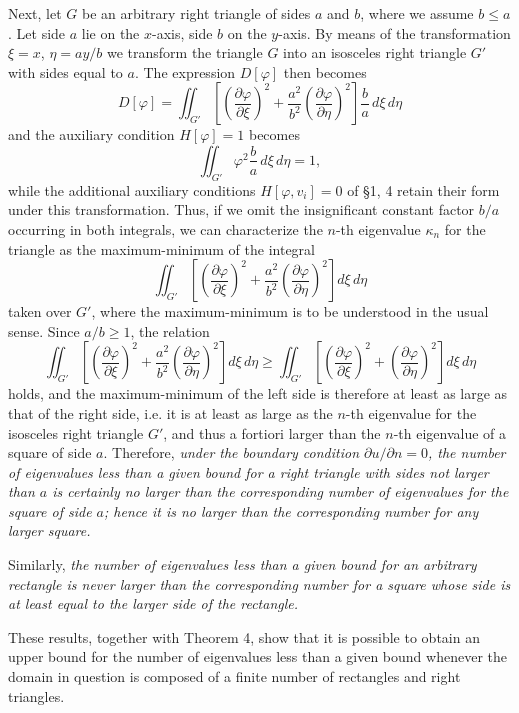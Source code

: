 Next, let $G$ be an arbitrary right triangle of sides $a$ and $b$, where we assume $b\le a$. Let side $a$ lie on the $x$-axis, side $b$ on the $y$-axis. By means of the transformation $\xi=x$, $\eta=ay/b$ we transform the triangle $G$ into an isosceles right triangle $G'$ with sides equal to $a$. The expression $D[\varphi]$ then becomes
\[
D[\varphi]=\iint_{G'}\left[\left(\frac{\partial\varphi}{\partial\xi}\right)^2
+\frac{a^2}{b^2}\left(\frac{\partial\varphi}{\partial\eta}\right)^2\right]\frac ba\,d\xi\,d\eta
\]
and the auxiliary condition $H[\varphi]=1$ becomes
\[
\iint_{G'}\varphi^2\frac ba\,d\xi\,d\eta=1,
\]
while the additional auxiliary conditions $H[\varphi,v_i]=0$ of \S1, 4 retain their form under this transformation. Thus, if we omit the insignificant constant factor $b/a$ occurring in both integrals, we can characterize the $n$-th eigenvalue $\kappa_n$ for the triangle as the maximum-minimum of the integral
\[
\iint_{G'}\left[\left(\frac{\partial\varphi}{\partial\xi}\right)^2
+\frac{a^2}{b^2}\left(\frac{\partial\varphi}{\partial\eta}\right)^2\right]d\xi\,d\eta
\]
taken over $G'$, where the maximum-minimum is to be understood in the usual sense. Since $a/b\ge1$, the relation
\[
\iint_{G'}\left[\left(\frac{\partial\varphi}{\partial\xi}\right)^2
+\frac{a^2}{b^2}\left(\frac{\partial\varphi}{\partial\eta}\right)^2\right]d\xi\,d\eta
\ge\iint_{G'}\left[\left(\frac{\partial\varphi}{\partial\xi}\right)^2
+\left(\frac{\partial\varphi}{\partial\eta}\right)^2\right]d\xi\,d\eta
\]
holds, and the maximum-minimum of the left side is therefore at least as large as that of the right side, i.e. it is at least as large as the $n$-th eigenvalue for the isosceles right triangle $G'$, and thus a fortiori larger than the $n$-th eigenvalue of a square of side $a$. Therefore, \emph{under the boundary condition $\partial u/\partial n=0$, the number of eigenvalues less than a given bound for a right triangle with sides not larger than $a$ is certainly no larger than the corresponding number of eigenvalues for the square of side $a$; hence it is no larger than the corresponding number for any larger square.}

Similarly, \emph{the number of eigenvalues less than a given bound for an arbitrary rectangle is never larger than the corresponding number for a square whose side is at least equal to the larger side of the rectangle.}

These results, together with Theorem 4, show that it is possible to obtain an upper bound for the number of eigenvalues less than a given bound whenever the domain in question is composed of a finite number of rectangles and right triangles.

